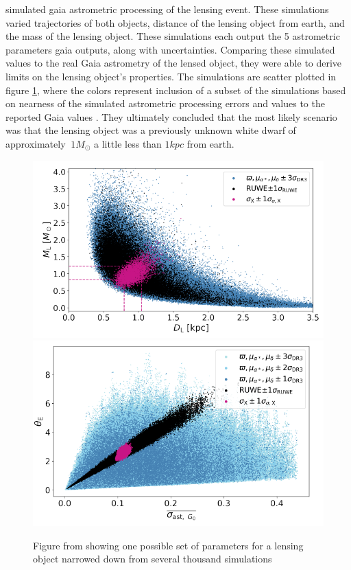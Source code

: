 \documentclass[twocolumn]{aastex631}
\begin{document}
\cite{jablonskaThere2022} simulated gaia astrometric processing of the lensing event. These simulations varied trajectories of both objects, distance of the lensing object from earth, and the mass of the lensing object. These simulations each output the 5 astrometric parameters gaia outputs, along with uncertainties. Comparing these simulated values to the real Gaia astrometry of the lensed object, they were able to derive limits on the lensing object's properties. The simulations are scatter plotted in figure \ref{fig:simulation}, where the colors represent inclusion of a subset of the simulations based on nearness of the simulated astrometric processing errors and values to the reported Gaia values \citep{jablonskaThere2022}. They ultimately concluded that the most likely scenario was that the lensing object was a previously unknown white dwarf of approximately $~1 M_\odot$ a little less than $1 kpc$ from earth.

\begin{figure}
	\includegraphics[width=\columnwidth]{microlensingsimMD.png}
	\includegraphics[width=\columnwidth]{microlensingsimTheta.png}
	\caption{Figure from \cite{jablonskaThere2022} showing one possible set of parameters for a lensing object narrowed down from several thousand simulations}
	\label{fig:simulation}
\end{figure}
\end{document}

